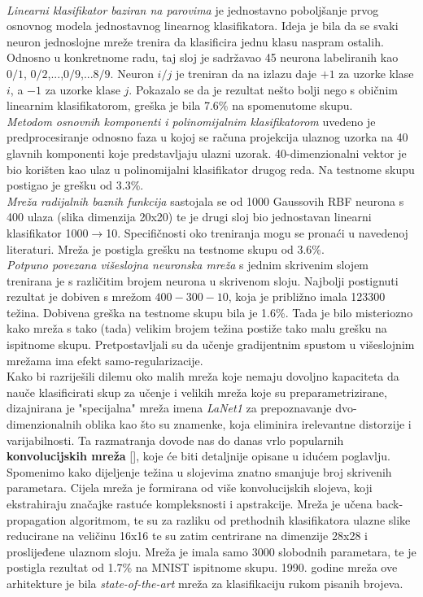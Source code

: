 \documentclass[times, utf8, diplomski]{fer}
\theoremstyle{definition}
\begin{document}
\\
\textit{Linearni klasifikator baziran na parovima}  je jednostavno poboljšanje prvog osnovnog modela jednostavnog linearnog klasifikatora. Ideja je bila da se svaki neuron jednoslojne mreže trenira da klasificira jednu klasu naspram ostalih. Odnosno u konkretnome radu, taj sloj je sadržavao 45 neurona labeliranih kao $0/1$, $0/2$,...,$0/9$,...$8/9$. Neuron $i/j$ je treniran da na izlazu daje $+1$ za uzorke klase $i$, a $-1$ za uzorke klase $j$. Pokazalo se da je rezultat nešto bolji nego s običnim linearnim klasifikatorom, greška je bila 7.6\% na spomenutome skupu.
\\
\textit{Metodom osnovnih komponenti i polinomijalnim klasifikatorom}  uvedeno je predprocesiranje odnosno faza u kojoj se računa projekcija ulaznog uzorka na 40 glavnih komponenti koje predstavljaju ulazni uzorak. 40-dimenzionalni vektor je bio korišten kao ulaz u polinomijalni klasifikator drugog reda. Na testnome skupu postigao je grešku od 3.3\%.
\\
\textit{Mreža radijalnih baznih funkcija }  sastojala se od 1000 Gaussovih RBF neurona s 400 ulaza (slika dimenzija 20x20) te je drugi sloj bio jednostavan linearni klasifikator 1000$\rightarrow$10. Specifičnosti oko treniranja mogu se pronaći u navedenoj literaturi. Mreža je postigla grešku na testnome skupu od 3.6\%.
\\
\textit{Potpuno povezana višeslojna neuronska mreža}  s jednim skrivenim slojem trenirana je s različitim brojem neurona u skrivenom sloju. Najbolji postignuti rezultat je dobiven s mrežom $400-300-10$,  koja je približno imala 123300 težina. Dobivena greška na testnome skupu bila je 1.6\%. Tada je bilo misteriozno kako mreža s tako (tada) velikim brojem težina postiže tako malu grešku na ispitnome skupu. Pretpostavljali su da učenje gradijentnim spustom u višeslojnim mrežama ima efekt samo-regularizacije.
\\
Kako bi razriješili dilemu oko malih mreža koje nemaju dovoljno kapaciteta da nauče klasificirati skup za učenje i velikih mreža koje su preparametrizirane, dizajnirana je "specijalna" mreža imena \textit{LaNet1} za prepoznavanje dvo-dimenzionalnih oblika kao što su znamenke, koja eliminira irelevantne distorzije i varijabilnosti. Ta razmatranja dovode nas do danas vrlo popularnih \textbf{konvolucijskih mreža} [\cite{NIPS1989_293}], koje će biti detaljnije opisane u idućem poglavlju. Spomenimo kako dijeljenje težina u slojevima znatno smanjuje broj skrivenih parametara. Cijela mreža je formirana od više konvolucijskih slojeva, koji ekstrahiraju značajke rastuće kompleksnosti i apstrakcije. Mreža je učena back-propagation algoritmom, te su za razliku od prethodnih klasifikatora ulazne slike reducirane na veličinu 16x16 te su zatim centrirane na dimenzije 28x28 i proslijeđene ulaznom sloju. Mreža je imala samo 3000 slobodnih parametara, te je postigla rezultat od 1.7\% na MNIST ispitnome skupu. 1990. godine mreža ove arhitekture je bila \textit{state-of-the-art} mreža za klasifikaciju rukom pisanih brojeva.
\end{document}
